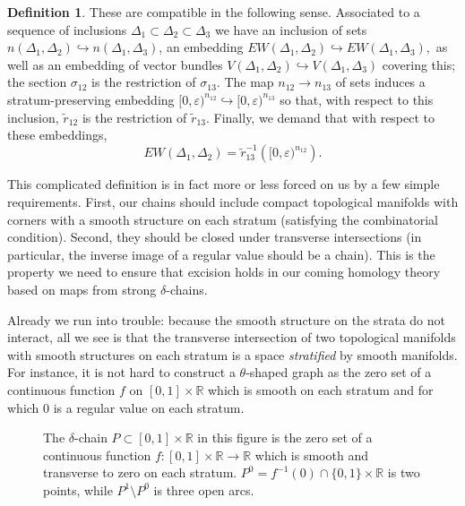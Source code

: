 \documentclass{memo-l}
\theoremstyle{definition}
\newtheorem{definition}[theorem]{Definition}
\theoremstyle{remark}
\numberwithin{section}{chapter}
\numberwithin{equation}{chapter}
\begin{document}
\begin{definition}
These are compatible in the following sense. Associated to a sequence of inclusions $\Delta_1 \subset \Delta_2 \subset \Delta_3$ we have an inclusion of sets $n(\Delta_1, \Delta_2) \hookrightarrow n(\Delta_1, \Delta_3)$, an embedding $EW(\Delta_1, \Delta_2) \hookrightarrow EW(\Delta_1, \Delta_3),$ as well as an embedding of vector bundles $V(\Delta_1, \Delta_2) \hookrightarrow V(\Delta_1, \Delta_3)$ covering this; the section $\sigma_{12}$ is the restriction of $\sigma_{13}$. The map $n_{12} \to n_{13}$ of sets induces a stratum-preserving embedding $[0,\varepsilon)^{n_{12}} \hookrightarrow [0,\varepsilon)^{n_{13}}$ so that, with respect to this inclusion, $\tilde r_{12}$ is the restriction of $\tilde r_{13}$. Finally, we demand that with respect to these embeddings, $$EW(\Delta_1, \Delta_2) = \tilde r_{13}^{-1}\left([0,\varepsilon)^{n_{12}}\right).$$
\end{definition}

This complicated definition is in fact more or less forced on us by a few simple requirements. First, our chains should include compact topological manifolds with corners with a smooth structure on each stratum (satisfying the combinatorial condition). Second, they should be closed under transverse intersections (in particular, the inverse image of a regular value should be a chain). This is the property we need to ensure that excision holds in our coming homology theory based on maps from strong $\delta$-chains.

Already we run into trouble: because the smooth structure on the strata do not interact, all we see is that the transverse intersection of two topological manifolds with smooth structures on each stratum is a space \textit{stratified} by smooth manifolds. For instance, it is not hard to construct a $\theta$-shaped graph as the zero set of a continuous function $f$ on $[0,1] \times \mathbb R$ which is smooth on each stratum and for which $0$ is a regular value on each stratum. 

\begin{figure}[h]
    \centering
    
    \caption{The $\delta$-chain $P \subset [0,1] \times \mathbb R$ in this figure is the zero set of a continuous function $f: [0,1] \times \mathbb R \to \mathbb R$ which is smooth and transverse to zero on each stratum. $P^0 = f^{-1}(0) \cap \{0,1\} \times \mathbb R$ is two points, while $P^1 \setminus P^0$ is three open arcs.}
    \label{fig:1}
\end{figure}
\end{document}
